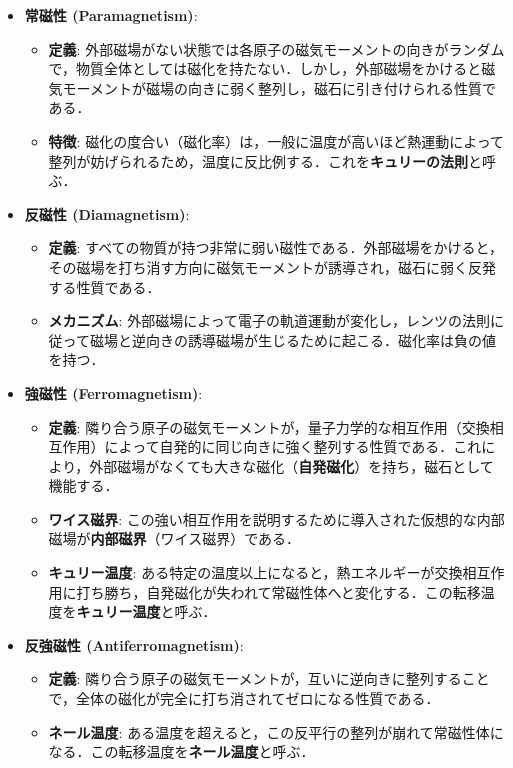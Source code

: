 \documentclass[11pt,a4paper]{ltjsarticle}
\newcommand{\supcite}[1]{\textsuperscript{\cite{#1}}}
\begin{document}
\begin{itemize}
\item \textbf{常磁性 (Paramagnetism)}:
  \begin{itemize}
  \item \textbf{定義}: 外部磁場がない状態では各原子の磁気モーメントの向きがランダムで，物質全体としては磁化を持たない．しかし，外部磁場をかけると磁気モーメントが磁場の向きに弱く整列し，磁石に引き付けられる性質である\supcite{ref1}．
  \item \textbf{特徴}: 磁化の度合い（磁化率）は，一般に温度が高いほど熱運動によって整列が妨げられるため，温度に反比例する．これを\textbf{キュリーの法則}と呼ぶ\supcite{ref1}．
  \end{itemize}

\item \textbf{反磁性 (Diamagnetism)}:
  \begin{itemize}
  \item \textbf{定義}: すべての物質が持つ非常に弱い磁性である．外部磁場をかけると，その磁場を打ち消す方向に磁気モーメントが誘導され，磁石に弱く反発する性質である\supcite{ref1}．
  \item \textbf{メカニズム}: 外部磁場によって電子の軌道運動が変化し，レンツの法則に従って磁場と逆向きの誘導磁場が生じるために起こる．磁化率は負の値を持つ\supcite{ref1}．
  \end{itemize}

\item \textbf{強磁性 (Ferromagnetism)}:
  \begin{itemize}
  \item \textbf{定義}: 隣り合う原子の磁気モーメントが，量子力学的な相互作用（交換相互作用）によって自発的に同じ向きに強く整列する性質である．これにより，外部磁場がなくても大きな磁化（\textbf{自発磁化}）を持ち，磁石として機能する\supcite{ref1}．
  \item \textbf{ワイス磁界}: この強い相互作用を説明するために導入された仮想的な内部磁場が\textbf{内部磁界}（ワイス磁界）である\supcite{ref1}．
  \item \textbf{キュリー温度}: ある特定の温度以上になると，熱エネルギーが交換相互作用に打ち勝ち，自発磁化が失われて常磁性体へと変化する．この転移温度を\textbf{キュリー温度}と呼ぶ\supcite{ref1}．
  \end{itemize}

\item \textbf{反強磁性 (Antiferromagnetism)}:
  \begin{itemize}
  \item \textbf{定義}: 隣り合う原子の磁気モーメントが，互いに逆向きに整列することで，全体の磁化が完全に打ち消されてゼロになる性質である\supcite{ref1}．
  \item \textbf{ネール温度}: ある温度を超えると，この反平行の整列が崩れて常磁性体になる．この転移温度を\textbf{ネール温度}と呼ぶ\supcite{ref1}．
  \end{itemize}


\end{itemize}
\end{document}
